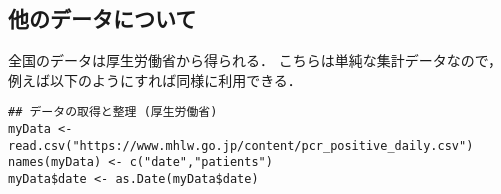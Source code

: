 \documentclass[10pt,oneside,fleqn]{scrartcl}
\begin{document}
\subsection{他のデータについて}
\label{sec:org4b5bcf0}

全国のデータは厚生労働省から得られる．
こちらは単純な集計データなので，
例えば以下のようにすれば同様に利用できる．

\begin{verbatim}
## データの取得と整理 (厚生労働省)
myData <- read.csv("https://www.mhlw.go.jp/content/pcr_positive_daily.csv")
names(myData) <- c("date","patients")
myData$date <- as.Date(myData$date)
\end{verbatim}
\end{document}
